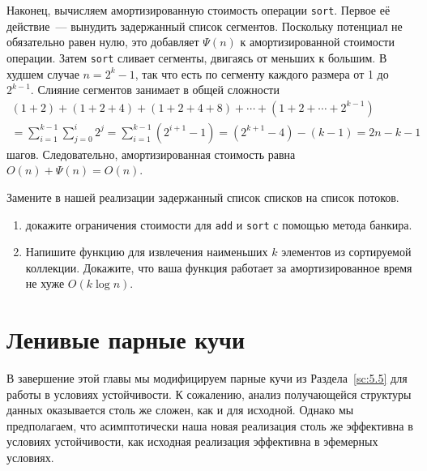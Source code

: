 Наконец, вычисляем амортизированную стоимость операции
\lstinline!sort!. Первое её действие~--- вынудить задержанный список
сегментов.  Поскольку потенциал не обязательно равен нулю, это
добавляет $\Psi(n)$ к амортизированной стоимости операции. Затем
\lstinline!sort! сливает сегменты, двигаясь от меньших к большим. В
худшем случае $n = 2^k -1$, так что есть по сегменту каждого размера
от 1 до $2^{k-1}$. Слияние сегментов занимает в общей сложности
$$
\begin{array}{l}
(1+2) + (1+2+4) + (1+2+4+8) + \cdots + (1 + 2 + \cdots + 2^{k-1}) \\
= \sum_{i=1}^{k-1}\sum_{j=0}^i 2^j = \sum_{i=1}^{k-1}(2^{i+1} - 1)
= (2^{k+1} - 4) - (k - 1) = 2n - k - 1
\end{array}
$$
шагов. Следовательно, амортизированная стоимость равна
$O(n) + \Psi(n) = O(n)$.

\begin{exercise}\label{ex:6.7}
Замените в нашей реализации задержанный список списков на список
потоков.
\begin{enumerate}
\item докажите ограничения стоимости для \lstinline!add! и
  \lstinline!sort! с помощью метода банкира.
\item Напишите функцию для извлечения наименьших $k$ элементов из
  сортируемой коллекции. Докажите, что ваша функция работает за
  амортизированное время не хуже $O(k \log n)$.
\end{enumerate}
\end{exercise}

\section{Ленивые парные кучи}
\label{sc:6.5}

В завершение этой главы мы модифицируем парные кучи из
Раздела~\ref{sc:5.5} для работы в условиях устойчивости. К сожалению,
анализ получающейся структуры данных оказывается столь же сложен, как
и для исходной. Однако мы предполагаем, что асимптотически наша новая
реализация столь же эффективна в условиях устойчивости, как исходная
реализация эффективна в эфемерных условиях.

